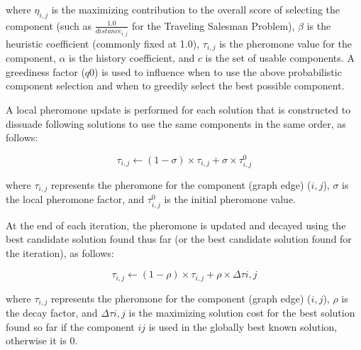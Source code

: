 where $\eta_{i,j}$ is the maximizing contribution to the overall score of selecting the component (such as $\frac{1.0}{distance_{i,j}}$ for the Traveling Salesman Problem), $\beta$ is the heuristic coefficient (commonly fixed at 1.0), $\tau_{i,j}$ is the pheromone value for the component, $\alpha$ is the history coefficient, and $c$ is the set of usable components. A greediness factor ($q0$) is used to influence when to use the above probabilistic component selection and when to greedily select the best possible component. 

A local pheromone update is performed for each solution that is constructed to dissuade following solutions to use the same components in the same order, as follows:

\begin{equation}
\tau_{i,j} \leftarrow (1-\sigma) \times \tau_{i,j} + \sigma \times \tau_{i,j}^{0}
\end{equation}

where $\tau_{i,j}$ represents the pheromone for the component (graph edge) ($i,j$), $\sigma$ is the local pheromone factor, and $\tau_{i,j}^{0}$ is the initial pheromone value.

At the end of each iteration, the pheromone is updated and decayed using the best candidate solution found thus far (or the best candidate solution found for the iteration), as follows:

\begin{equation}
\tau_{i,j} \leftarrow (1-\rho) \times \tau_{i,j} + \rho \times \Delta\tau{i,j}
\end{equation}

where $\tau_{i,j}$ represents the pheromone for the component (graph edge) ($i,j$), $\rho$ is the decay factor, and $\Delta\tau{i,j}$ is the maximizing solution cost for the best solution found so far if the component $ij$ is used in the globally best known solution, otherwise it is 0. 

